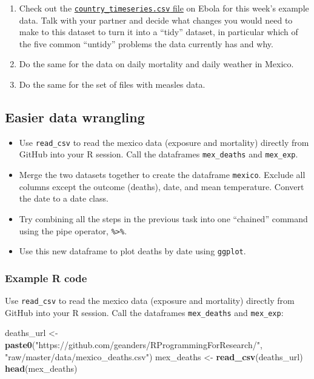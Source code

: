 \documentclass[]{book}
\makeatletter
\newenvironment{Shaded}{\begin{snugshade}}{\end{snugshade}}
\newcommand{\KeywordTok}[1]{\textcolor[rgb]{0.13,0.29,0.53}{\textbf{#1}}}
\newcommand{\StringTok}[1]{\textcolor[rgb]{0.31,0.60,0.02}{#1}}
\newcommand{\NormalTok}[1]{#1}
\providecommand{\tightlist}{%
  \setlength{\itemsep}{0pt}\setlength{\parskip}{0pt}}
\newenvironment{kframe}{%
\medskip{}
\setlength{\fboxsep}{.8em}
 \def\at@end@of@kframe{}%
 \ifinner\ifhmode%
  \def\at@end@of@kframe{\end{minipage}}%
  \begin{minipage}{\columnwidth}%
 \fi\fi%
 \def\FrameCommand##1{\hskip\@totalleftmargin \hskip-\fboxsep
 \colorbox{shadecolor}{##1}\hskip-\fboxsep
     \hskip-\linewidth \hskip-\@totalleftmargin \hskip\columnwidth}%
 \MakeFramed {\advance\hsize-\width
   \@totalleftmargin\z@ \linewidth\hsize
   \@setminipage}}%
 {\par\unskip\endMakeFramed%
 \at@end@of@kframe}
\renewenvironment{Shaded}{\begin{kframe}}{\end{kframe}}
\theoremstyle{definition}
\theoremstyle{definition}
\theoremstyle{definition}
\theoremstyle{remark}
\makeatother
\begin{document}
\begin{enumerate}
\def\labelenumi{\arabic{enumi}.}
\tightlist
\item
  Check out the
  \href{https://github.com/geanders/RProgrammingForResearch/raw/master/data/country_timeseries.csv}{\texttt{country\_timeseries.csv}
  file} on Ebola for this week's example data. Talk with your partner
  and decide what changes you would need to make to this dataset to turn
  it into a ``tidy'' dataset, in particular which of the five common
  ``untidy'' problems the data currently has and why.
\item
  Do the same for the data on daily mortality and daily weather in
  Mexico.
\item
  Do the same for the set of files with measles data.
\end{enumerate}

\subsection{Easier data wrangling}\label{easier-data-wrangling}

\begin{itemize}
\tightlist
\item
  Use \texttt{read\_csv} to read the mexico data (exposure and
  mortality) directly from GitHub into your R session. Call the
  dataframes \texttt{mex\_deaths} and \texttt{mex\_exp}.
\item
  Merge the two datasets together to create the dataframe
  \texttt{mexico}. Exclude all columns except the outcome (deaths),
  date, and mean temperature. Convert the date to a date class.
\item
  Try combining all the steps in the previous task into one ``chained''
  command using the pipe operator, \texttt{\%\textgreater{}\%}.
\item
  Use this new dataframe to plot deaths by date using \texttt{ggplot}.
\end{itemize}

\subsubsection{Example R code}\label{example-r-code-10}

Use \texttt{read\_csv} to read the mexico data (exposure and mortality)
directly from GitHub into your R session. Call the dataframes
\texttt{mex\_deaths} and \texttt{mex\_exp}:

\begin{Shaded}
\begin{Highlighting}[]
\NormalTok{deaths_url <-}\StringTok{ }\KeywordTok{paste0}\NormalTok{(}\StringTok{"https://github.com/geanders/RProgrammingForResearch/"}\NormalTok{,}
                     \StringTok{"raw/master/data/mexico_deaths.csv"}\NormalTok{)}
\NormalTok{mex_deaths <-}\StringTok{ }\KeywordTok{read_csv}\NormalTok{(deaths_url)}
\KeywordTok{head}\NormalTok{(mex_deaths)}
\end{Highlighting}
\end{Shaded}
\end{document}
